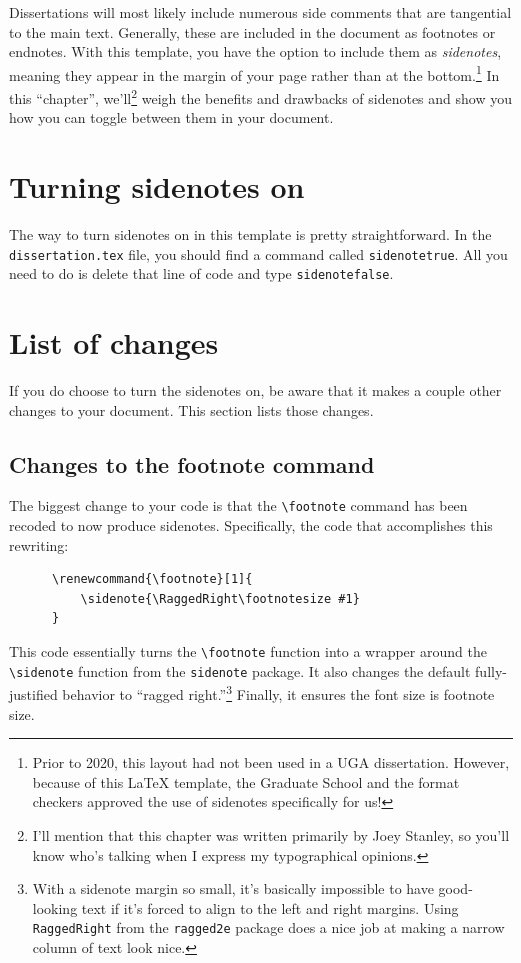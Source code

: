 \documentclass[./dissertation.tex]{subfiles}
\begin{document}

    Dissertations will most likely include numerous side comments that are tangential to the main text. Generally, these are included in the document as footnotes or endnotes. With this template, you have the option to include them as \textit{sidenotes}, meaning they appear in the margin of your page rather than at the bottom.\footnote{Prior to 2020, this layout had not been used in a UGA dissertation. However, because of this {\LaTeX} template, the Graduate School and the format checkers approved the use of sidenotes specifically for us!} In this ``chapter'', we'll\footnote{I'll mention that this chapter was written primarily by Joey Stanley, so you'll know who's talking when I express my typographical opinions.} weigh the benefits and drawbacks of sidenotes and show you how you can toggle between them in your document.

    \section{Turning sidenotes on}

    The way to turn sidenotes on in this template is pretty straightforward. In the \texttt{dissertation.tex} file, you should find a command called \verb+sidenotetrue+. All you need to do is delete that line of code and type \verb+sidenotefalse+.

    \section{List of changes}

    If you do choose to turn the sidenotes on, be aware that it makes a couple other changes to your document. This section lists those changes.

    \subsection{Changes to the footnote command}

    The biggest change to your code is that the \verb+\footnote+ command has been recoded to now produce sidenotes. Specifically, the code that accomplishes this rewriting:
    \begin{verbatim}
      \renewcommand{\footnote}[1]{
          \sidenote{\RaggedRight\footnotesize #1}
      }
    \end{verbatim}
    This code essentially turns the \verb+\footnote+ function into a wrapper around the \verb+\sidenote+ function from the \texttt{sidenote} package. It also changes the default fully-justified behavior to ``ragged right.''\footnote{With a sidenote margin so small, it's basically impossible to have good-looking text if it's forced to align to the left and right margins. Using \texttt{RaggedRight} from the \texttt{ragged2e} package does a nice job at making a narrow column of text look nice.} Finally, it ensures the font size is footnote size.
\end{document}
